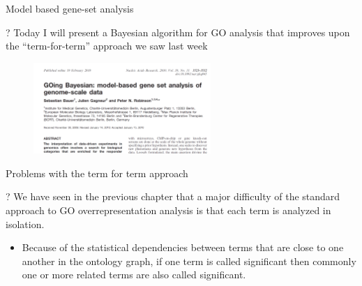 \documentclass{beamer}
\begin{document}
\begin{frame}{Model based gene-set analysis}
\begin{mybluebox}{?}
Today I will present a Bayesian algorithm for GO analysis that improves upon the ``term-for-term'' 
approach we saw last week
\end{mybluebox}

 \begin{figure}
 \centering
 \includegraphics[width=0.6\textwidth]{./img/GOingBayesian-title.png}
\end{figure}


\end{frame}

\begin{frame}{Problems with the term for term approach}
 \begin{mybluebox}{?}
  We have seen in the previous chapter that a major difficulty of the
standard approach to GO overrepresentation analysis is that each term
is analyzed in isolation. 
 \end{mybluebox}
\begin{itemize}
 \item  Because of the statistical dependencies
between terms that are close to one another in the ontology graph, if
one term is called significant then commonly one or more related
terms are also called significant.
\end{itemize}


\end{frame}
\end{document}
